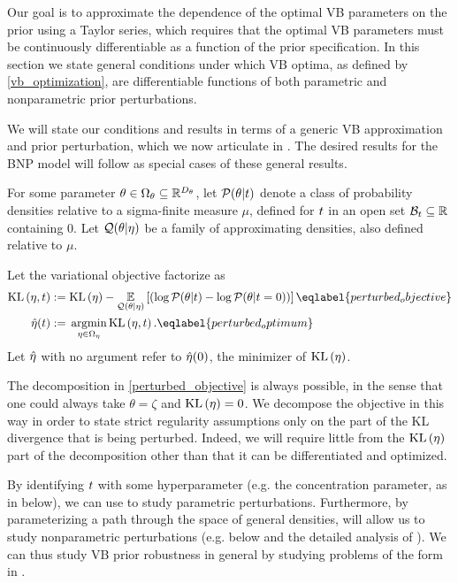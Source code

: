 Our goal is to approximate the dependence of the optimal VB parameters on the
prior using a Taylor series, which requires that the optimal VB parameters must
be continuously differentiable as a function of the prior specification. In this
section we state general conditions under which VB optima, as defined by
\eqref{vb_optimization}, are differentiable functions of both parametric and
nonparametric prior perturbations.

We will state our conditions and results in terms of a generic VB approximation
and prior perturbation, which we now articulate in  . The
desired results for the BNP model will follow as special cases of these general
results.

\begin{defn}
%
For some parameter $\theta \in \Omega_{\theta} \subseteq \mathbb{R}^{{D_{\theta}}}$, let
$\mathcal{P}(\theta \vert t)$ denote a class of probability densities relative to
a sigma-finite measure $\mu$, defined for $t$ in an open set $\mathcal{B}_t
\subseteq \mathbb{R}$ containing $0$.  Let $\mathcal{Q}(\theta \vert \eta)$ be a
family of approximating densities, also defined relative to $\mu$.

Let the variational objective factorize as
%
\begin{align}
%
\KL{\eta, \t} :={}&
    \KL{\eta} -
    \expect{\q(\theta \vert \eta)}
       {\left(\log \p(\theta \vert \t) - \log \p(\theta \vert \t=0)\right)}           \eqlabel{perturbed_objective}\\
\etaopt(\t) :={}& \argmin_{\eta \in \etadom} \KL{\eta, \t}.
    \eqlabel{perturbed_optimum}
%
\end{align}
%
Let $\hat\eta$ with no argument refer to $\hat\eta(0)$, the minimizer
of $\mathrm{KL}\left(\eta\right)$.
%
\end{defn}

The decomposition in \eqref{perturbed_objective} is always possible, in the sense
that one could always take $\theta = \zeta$ and $\mathrm{KL}\left(\eta\right) = 0$.  We decompose
the objective in this way in order to state strict regularity assumptions only
on the part of the KL divergence that is being perturbed.  Indeed, we will
require little from the $\mathrm{KL}\left(\eta\right)$ part of the decomposition other than that it
can be differentiated and optimized.

By identifying $t$ with some hyperparameter (e.g. the concentration parameter,
as in  below), we can use  to study
parametric perturbations.  Furthermore, by parameterizing a path through the
space of general densities,  will allow us to study
nonparametric perturbations (e.g.  below and the
detailed analysis of ).  We
can thus study VB prior robustness in general by studying problems of the
form in .

